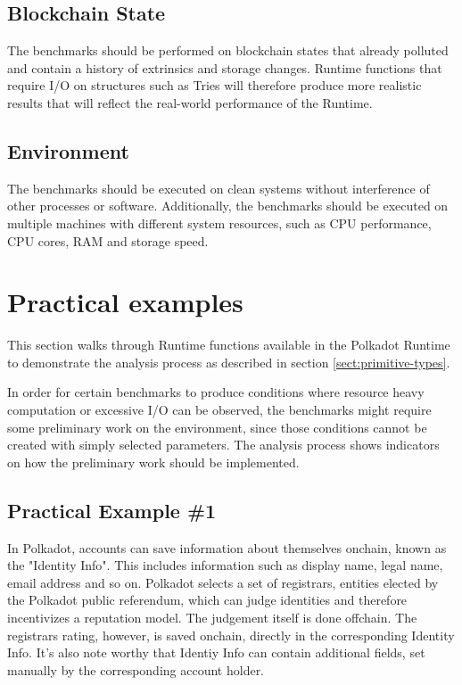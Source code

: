 \documentclass[11pt,a4paper]{article}
\begin{document}
\subsection{Blockchain State}
The benchmarks should be performed on blockchain states that already polluted
and contain a history of extrinsics and storage changes. Runtime functions that
require I/O on structures such as Tries will therefore produce more realistic
results that will reflect the real-world performance of the Runtime.

\subsection{Environment}
The benchmarks should be executed on clean systems without interference of other
processes or software. Additionally, the benchmarks should be executed on
multiple machines with different system resources, such as CPU performance, CPU
cores, RAM and storage speed.

\section{Practical examples}\label{sec:practical-examples}

This section walks through Runtime functions available in the Polkadot Runtime
to demonstrate the analysis process as described in section
\ref{sect:primitive-types}.
\newline

In order for certain benchmarks to produce conditions where resource heavy
computation or excessive I/O can be observed, the benchmarks might require some
preliminary work on the environment, since those conditions cannot be created
with simply selected parameters. The analysis process shows indicators on how
the preliminary work should be implemented.

\subsection{Practical Example \#1}

In Polkadot, accounts can save information about themselves onchain, known as
the "Identity Info". This includes information such as display name, legal name,
email address and so on. Polkadot selects a set of registrars, entities elected
by the Polkadot public referendum, which can judge identities and therefore
incentivizes a reputation model. The judgement itself is done offchain. The
registrars rating, however, is saved onchain, directly in the corresponding
Identity Info. It's also note worthy that Identiy Info can contain additional
fields, set manually by the corresponding account holder.
\newline
\end{document}
